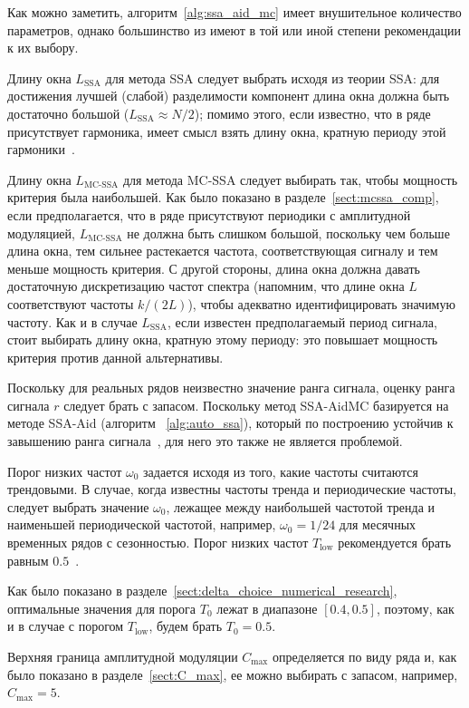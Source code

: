 \documentclass[specialist,
substylefile = spbu_report.rtx,
subf,12pt]{disser}
\theoremstyle{definition}
\begin{document}
Как можно заметить, алгоритм~\ref{alg:ssa_aid_mc} имеет внушительное количество параметров, однако большинство из имеют в той или иной степени рекомендации к их выбору.

Длину окна $L_\text{SSA}$ для метода SSA следует выбрать исходя из теории SSA: для достижения лучшей (слабой) разделимости компонент длина окна должна быть достаточно большой ($L_\text{SSA}\approx N / 2$); помимо этого, если известно, что в ряде присутствует гармоника, имеет смысл взять длину окна, кратную периоду этой гармоники~\cite{Golyandina2001}.

Длину окна $L_\text{MC-SSA}$ для метода MC-SSA следует выбирать так, чтобы мощность критерия была наибольшей. Как было показано в разделе~\ref{sect:mcssa_comp}, если предполагается, что в ряде присутствуют периодики с амплитудной модуляцией, $L_\text{MC-SSA}$ не должна быть слишком большой, поскольку чем больше длина окна, тем сильнее растекается частота, соответствующая сигналу и тем меньше мощность критерия. С другой стороны, длина окна должна давать достаточную дискретизацию частот спектра (напомним, что длине окна $L$ соответствуют частоты $k/(2L)$), чтобы адекватно идентифицировать значимую частоту. Как и в случае $L_\text{SSA}$, если известен предполагаемый период сигнала, стоит выбирать длину окна, кратную этому периоду: это повышает мощность критерия против данной альтернативы.   

Поскольку для реальных рядов неизвестно значение ранга сигнала, оценку ранга сигнала $r$ следует брать с запасом. Поскольку метод SSA-AidMC базируется на методе SSA-Aid (алгоритм ~\ref{alg:auto_ssa}), который по построению устойчив к завышению ранга сигнала~\cite{Dudnik2025}, для него это также не является проблемой.

Порог низких частот $\omega_0$ задается исходя из того, какие частоты считаются трендовыми. В случае, когда известны частоты тренда и периодические частоты, следует выбрать значение $\omega_0$, лежащее между наибольшей частотой тренда и наименьшей периодической частотой, например, $\omega_0=1/24$ для месячных временных рядов с сезонностью. Порог низких частот $T_\text{low}$ рекомендуется брать равным $0.5$~\cite{autoSSA}.

Как было показано в разделе~\ref{sect:delta_choice_numerical_research}, оптимальные значения для порога $T_0$ лежат в диапазоне $[0.4, 0.5]$, поэтому, как и в случае с порогом $T_\text{low}$, будем брать $T_0=0.5$.

Верхняя граница амплитудной модуляции $C_\text{max}$ определяется по виду ряда и, как было показано в разделе~\ref{sect:C_max}, ее можно выбирать с запасом, например, $C_\text{max}=5$.
\end{document}
